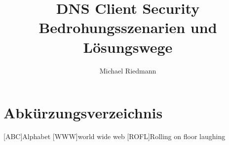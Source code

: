 \documentclass[Bachelor, BIC, german]{twbook}
\title{DNS Client Security\\Bedrohungsszenarien und Lösungswege}
\author{Michael Riedmann}
\begin{document}
\maketitle

\listoftodos





















 

\clearpage

\listoffigures
\clearpage

\listoftables
\clearpage

\lstlistoflistings
\clearpage

{}
\chapter*{Abkürzungsverzeichnis}
\begin{acronym}[XXXXX]
    [ABC]{Alphabet}
    [WWW]{world wide web}
    [ROFL]{Rolling on floor laughing}
\end{acronym}


\end{document}
